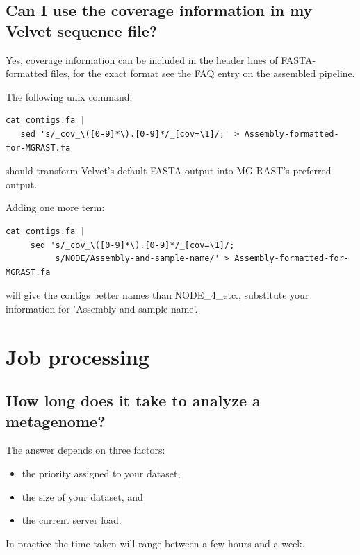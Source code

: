 \documentclass[12pt,fullpage]{report}
\begin{document}
\subsection*{Can I use the coverage information in my Velvet sequence file?}
Yes, coverage information can be included in the header lines of FASTA-formatted files, for the exact format see the FAQ entry on the assembled pipeline.

\noindent
The following unix command:

\noindent
\begin{small}
\begin{verbatim}
cat contigs.fa |
   sed 's/_cov_\([0-9]*\).[0-9]*/_[cov=\1]/;' > Assembly-formatted-for-MGRAST.fa
\end{verbatim}
\end{small}
\noindent
should transform Velvet's default FASTA output into MG-RAST's preferred output.


\noindent
Adding one more term:
\noindent
\begin{small}
\begin{verbatim}
cat contigs.fa |
     sed 's/_cov_\([0-9]*\).[0-9]*/_[cov=\1]/;
          s/NODE/Assembly-and-sample-name/' > Assembly-formatted-for-MGRAST.fa
\end{verbatim}
\end{small}

\noindent
will give the contigs better names than NODE\_4\_etc., substitute your information for 'Assembly-and-sample-name'.
\section{Job processing}
\subsection*{How long does it take to analyze a metagenome?}
The answer depends on three factors:
\begin{itemize}
\item  the priority assigned to your dataset,
\item  the size of your dataset, and
\item  the current server load.
\end{itemize}
In practice the time taken will range between a few hours and a week.
\end{document}
